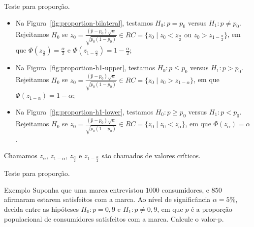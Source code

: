 \documentclass[8pt]{beamer}
\begin{document}
\begin{frame}{Teste para proporção.}

\begin{itemize}
	\item Na Figura~\ref{fig:proportion-bilateral}, testamos $H_0: p = p_0$ versus $H_1: p \neq p_0$. Rejeitamos $H_0$ se $z_0 = \frac{(\hat{p} - p_0)\sqrt{n}}{\sqrt{p_0(1-p_0)}} \in \allowbreak RC=\{z_0 \mid z_0 < z_\frac{\alpha}{2} \mbox{ ou } z_0 > z_{1-\frac{\alpha}{2}} \}$, em que $\Phi\left( z_\frac{\alpha}{2} \right) = \frac{\alpha}{2}$ e $\Phi\left( z_{1-\frac{\alpha}{2}} \right) = 1- \frac{\alpha}{2}$;
	\vfill
	
	\item Na Figura~\ref{fig:proportion-h1-upper}, testamos $H_0: p \leq p_0$ versus $H_1: p > p_0$. Rejeitamos $H_0$ se $z_0 = \frac{(\hat{p} - p_0)\sqrt{n}}{\sqrt{p_0(1-p_0)}} \in \allowbreak RC=\{z_0 \mid z_0 > z_{1-\alpha}  \}$, em que $\Phi\left( z_{1-\alpha} \right) =1- \alpha$;
	\vfill
	
	\item Na Figura~\ref{fig:proportion-h1-lower}, testamos $H_0: p \geq p_0$ versus $H_1: p < p_0$. Rejeitamos $H_0$ se $z_0 = \frac{(\hat{p} - p_0)\sqrt{n}}{\sqrt{p_0(1-p_0)}} \in \allowbreak RC=\{z_0 \mid z_0 < z_{\alpha}  \}$, em que $\Phi\left( z_{\alpha} \right) = \alpha$.
\end{itemize}
Chamamos $z_\alpha$, $z_{1-\alpha}$, $z_\frac{\alpha}{2}$ e $z_{1-\frac{\alpha}{2}}$ são chamados de valores críticos.

\end{frame}


\begin{frame}{Teste para proporção.}

\large

\begin{block}{Exemplo}
	Suponha que uma marca entrevistou $1000$ consumidores, e $850$ afirmaram estarem satisfeitos com a marca. Ao nível de significância $\alpha=5\%$, decida entre as hipóteses $H_0: p = 0,9$ e $H_1: p\neq 0,9$, em que $p$ é a proporção populacional de consumidores satisfeitos com a marca. Calcule o valor-p.
\end{block}

\normalsize

\end{frame}
\end{document}
